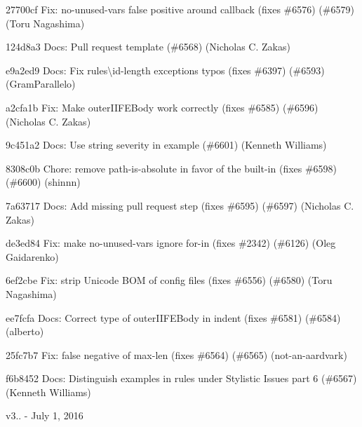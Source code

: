 \begin{DoxyItemize}
\item 27700cf Fix\+: {\ttfamily no-\/unused-\/vars} false positive around callback (fixes \#6576) (\#6579) (Toru Nagashima)
\item 124d8a3 Docs\+: Pull request template (\#6568) (Nicholas C. Zakas)
\item e9a2ed9 Docs\+: Fix rules\textbackslash{}id-\/length exceptions typos (fixes \#6397) (\#6593) (Gram\+Parallelo)
\item a2cfa1b Fix\+: Make outer\+I\+I\+F\+E\+Body work correctly (fixes \#6585) (\#6596) (Nicholas C. Zakas)
\item 9c451a2 Docs\+: Use string severity in example (\#6601) (Kenneth Williams)
\item 8308c0b Chore\+: remove path-\/is-\/absolute in favor of the built-\/in (fixes \#6598) (\#6600) (shinnn)
\item 7a63717 Docs\+: Add missing pull request step (fixes \#6595) (\#6597) (Nicholas C. Zakas)
\item de3ed84 Fix\+: make {\ttfamily no-\/unused-\/vars} ignore for-\/in (fixes \#2342) (\#6126) (Oleg Gaidarenko)
\item 6ef2cbe Fix\+: strip Unicode B\+OM of config files (fixes \#6556) (\#6580) (Toru Nagashima)
\item ee7fcfa Docs\+: Correct type of {\ttfamily outer\+I\+I\+F\+E\+Body} in {\ttfamily indent} (fixes \#6581) (\#6584) (alberto)
\item 25fc7b7 Fix\+: false negative of {\ttfamily max-\/len} (fixes \#6564) (\#6565) (not-\/an-\/aardvark)
\item f6b8452 Docs\+: Distinguish examples in rules under Stylistic Issues part 6 (\#6567) (Kenneth Williams)
\end{DoxyItemize}

v3.. -\/ July 1, 2016



